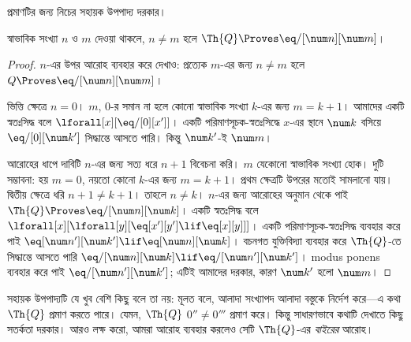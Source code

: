 \documentclass[../../../include/open-logic-section]{subfiles}
\begin{document}
প্রমাণটির জন্য নিচের সহায়ক উপপাদ্য দরকার।

\begin{lem}
 স্বাভাবিক সংখ্যা $n$ ও $m$ দেওয়া থাকলে, $n
\neq m$ হলে $\Th{Q} \Proves \eq/[\num n][\num m]$।
\end{lem}

\begin{proof}
$n$-এর উপর আরোহ ব্যবহার করে দেখাও: প্রত্যেক $m$-এর জন্য $n \neq m$ হলে
$Q \Proves \eq/[\num n][\num m]$।

ভিত্তি ক্ষেত্রে $n = 0$। $m$, $0$-র সমান না হলে কোনো স্বাভাবিক সংখ্যা
$k$-এর জন্য $m = k + 1$। আমাদের একটি স্বতঃসিদ্ধ বলে
$\lforall[x][\eq/[0][x']]$। একটি পরিমাণসূচক-স্বতঃসিদ্ধে $x$-এর স্থানে
$\num k$ বসিয়ে $\eq/[0][\num k']$ সিদ্ধান্তে আসতে পারি। কিন্তু
$\num k'$-ই $\num m$।

আরোহের ধাপে দাবিটি $n$-এর জন্য সত্য ধরে $n+1$ বিবেচনা করি। $m$ যেকোনো
স্বাভাবিক সংখ্যা হোক। দুটি সম্ভাবনা: হয় $m = 0$, নয়তো কোনো $k$-এর জন্য
$m = k+1$। প্রথম ক্ষেত্রটি উপরের মতোই সামলানো যায়। দ্বিতীয় ক্ষেত্রে ধরি
$n+1 \neq k+1$। তাহলে $n \neq k$। $n$-এর জন্য আরোহের অনুমান থেকে পাই
$\Th{Q} \Proves \eq/[\num n][\num k]$। একটি স্বতঃসিদ্ধ বলে
$\lforall[x][\lforall[y][\eq[x'][y'] \lif \eq[x][y]]]$। একটি
পরিমাণসূচক-স্বতঃসিদ্ধ ব্যবহার করে পাই
$\eq[\num n'][\num k'] \lif \eq[\num n][\num k]$। বচনগত যুক্তিবিদ্যা
ব্যবহার করে $\Th{Q}$-তে সিদ্ধান্তে আসতে পারি
$\eq/[\num n][\num k] \lif \eq/[\num n'][\num k']$। modus ponens
ব্যবহার করে পাই $\eq/[\num n'][\num k']$; এটিই আমাদের দরকার, কারণ
$\num k'$ হলো $\num m$।
\end{proof}

\begin{explain}
সহায়ক উপপাদ্যটি যে খুব বেশি কিছু বলে তা নয়: মূলত বলে, আলাদা সংখ্যাপদ
আলাদা বস্তুকে নির্দেশ করে—এ কথা $\Th{Q}$ প্রমাণ করতে পারে। যেমন, $\Th{Q}$
$0'' \neq 0'''$ প্রমাণ করে। কিন্তু সাধারণভাবে কথাটি দেখাতে কিছু সতর্কতা
দরকার। আরও লক্ষ করো, আমরা আরোহ ব্যবহার করলেও সেটি $\Th{Q}$-এর
\emph{বাইরের} আরোহ।
\end{explain}
\end{document}
